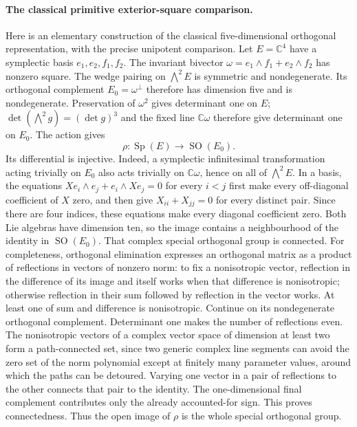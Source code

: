 \documentclass[11pt,a4paper]{article}
\theoremstyle{definition}
\begin{document}
\paragraph{The classical primitive exterior-square comparison.}
Here is an elementary construction of the classical five-dimensional
orthogonal representation, with the precise unipotent comparison.
Let $E=\mathbb C^4$ have a symplectic basis $e_1,e_2,f_1,f_2$.
The invariant bivector $\omega=e_1\wedge f_1+e_2\wedge f_2$ has
nonzero square. The wedge pairing on $\bigwedge^2E$ is symmetric
and nondegenerate. Its orthogonal complement
$E_0=\omega^\perp$ therefore has dimension five and is nondegenerate.
Preservation of $\omega^2$ gives determinant one on $E$;
$\det(\bigwedge^2g)=(\det g)^3$ and the fixed line
$\mathbb C\omega$ therefore give determinant one on $E_0$.
The action gives
\[
 \rho:\operatorname{Sp}(E)\longrightarrow\operatorname{SO}(E_0).
\]
Its differential is injective. Indeed, a symplectic infinitesimal
transformation acting trivially on $E_0$ also acts trivially on
$\mathbb C\omega$, hence on all of $\bigwedge^2E$. In a basis,
the equations $Xe_i\wedge e_j+e_i\wedge Xe_j=0$ for every $i<j$
first make every off-diagonal coefficient of $X$ zero, and then give
$X_{ii}+X_{jj}=0$ for every distinct pair. Since there are four
indices, these equations make every diagonal coefficient zero.
Both Lie algebras have dimension ten, so the image contains a
neighbourhood of the identity in $\operatorname{SO}(E_0)$.
That complex special orthogonal group is connected. For completeness,
orthogonal elimination expresses an orthogonal matrix as a product
of reflections in vectors of nonzero norm: to fix a nonisotropic
vector, reflection in the difference of its image and itself works
when that difference is nonisotropic; otherwise reflection in their
sum followed by reflection in the vector works. At least one of
sum and difference is nonisotropic. Continue on its nondegenerate
orthogonal complement. Determinant one makes the number of
reflections even. The nonisotropic vectors of a complex vector
space of dimension at least two form a path-connected set, since
two generic complex line segments can avoid the zero set of the
norm polynomial except at finitely many parameter values, around
which the paths can be detoured. Varying one vector in a pair of
reflections to the other connects that pair to the identity.
The one-dimensional final complement contributes only the already
accounted-for sign. This proves connectedness. Thus the open image
of $\rho$ is the whole special orthogonal group.
\end{document}
